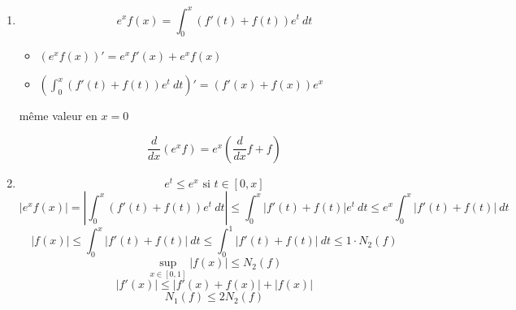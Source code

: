 \documentclass[a4paper]{article}
\begin{document}
\begin{enumerate}
\item 
    \[
    e^xf(x) = \int_{{0}}^{{x}} {(f'(t) + f(t))e^t} \: d{t} 
    \] 

    \begin{itemize}
        \item $(e^xf(x))' = e^xf'(x) + e^xf(x)$
        \item  $\left( \int_{{0}}^{{x}} {(f'(t) + f(t))e^t} \: d{t} \right)' = (f'(x) + f(x))e^x$
    \end{itemize}
    même valeur en $x=0$

     \[
    \frac{d}{dx}(e^xf) = e^x(\frac{d}{dx}f + f)
    \] 

\item 
    \[
        e^t \le e^x \text{ si } t \in [0, x]
    \] 
    \[
    |e^xf(x)| = \left| \int_{{0}}^{{x}} {(f'(t) + f(t))e^t} \: d{t} \right| \le \int_{{0}}^{{x}} {|f'(t) + f(t)|e^t} \: d{t} \le e^x \int_{{0}}^{{x}} {|f'(t) + f(t)|} \: d{t}
    \] 
    \[
    |f(x)| \le \int_{{0}}^{{x}} {|f'(t) + f(t)|} \: d{t} \le \int_{{0}}^{{1}} {|f'(t) + f(t)|} \: d{t} \le 1 \cdot N_2(f)
    \] 
    \[
        \sup_{x \in [0,1]}|f(x)| \le N_2(f)
    \] 
    \[
    |f'(x)| \le |f'(x) + f(x)| + |f(x)|
    \] 
    \[
    N_1(f) \le 2N_2(f)
    \] 
\end{enumerate}
\end{document}
